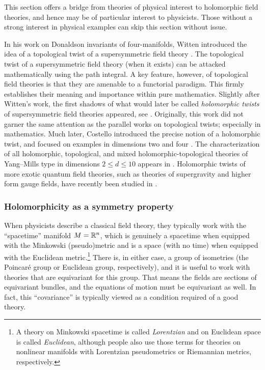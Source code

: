 \documentclass[11pt]{amsart}
\begin{document}

This section offers a bridge from theories of physical interest to holomorphic field theories,
and hence may be of particular interest to physicists.
Those without a strong interest in physical examples can skip this section without issue.

In his work on Donaldson invariants of four-manifolds, Witten introduced the idea of a topological twist of a supersymmetric field theory \cite{WittenTwist}.
The topological twist of a supersymmetric field theory (when it exists) can be attacked mathematically using the path integral.
A key feature, however, of topological field theories is that they are amenable to a functorial paradigm.
This firmly establishes their meaning and importance within pure mathematics.
Slightly after Witten's work, the first shadows of what would later be called \textit{holomorphic twists} of supersymmetric field theories appeared, see \cite{Johansen:1994aw,Johansen:1994ud,NekThesis,Losev:1996up,Losev:1995cr,Johansen:2003hw,Eager:2018oww}. 
Originally, this work did not garner the same attention as the parallel works on topological twists; especially in mathematics.
Much later, Costello introduced the precise notion of a holomorphic twist, and focused on examples in dimensions two and four \cite{CosSUSY}.
The characterization of all holomorphic, topological, and mixed holomorphic-topological theories of Yang--Mills type in dimensions $2 \leq d \leq 10$ appears in \cite{ESW}.
Holomorphic twists of more exotic quantum field theories, such as theories of supergravity and higher form gauge fields, have recently been studied in \cite{CLsugra,SWtensor,SWpure,Raghavendran:2021qbh,Eager:2021ufo,Garner:2023wrc}.

\subsubsection{Holomorphicity as a symmetry property}

When physicists describe a classical field theory,
they typically work with the ``spacetime'' manifold $M = \mathbb R^n$,
which is genuinely a spacetime when equipped with the Minkowski (pseudo)metric and is a space (with no time) when equipped with the Euclidean metric.\footnote{A theory on Minkowski spacetime is called {\it Lorentzian} and on Euclidean space is called {\it Euclidean},
although people also use those terms for theories on nonlinear manifolds with Lorentzian pseudometrics or Riemannian metrics, respectively.}
There is, in either case, a group of isometries (the Poincar\'e group or Euclidean group, respectively),
and it is useful to work with theories that are equivariant for this group.
That means the fields are sections of equivariant bundles,
and the equations of motion must be equivariant as well.
In fact, this ``covariance'' is typically viewed as a condition required of a good theory.
\end{document}
